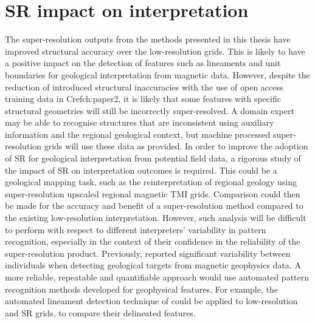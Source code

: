 \documentclass[manuscript.tex]{subfiles}
\begin{document}
\section{SR impact on interpretation}
The super-resolution outputs from the methods presented in this thesis have improved structural accuracy over the low-resolution grids.
This is likely to have a positive impact on the detection of features such as lineaments and unit boundaries for geological interpretation from magnetic data.
However, despite the reduction of introduced structural inaccuracies with the use of open access training data in Cref{ch:paper2}, it is likely that some features with specific structural geometries will still be incorrectly super-resolved.
A domain expert may be able to recognise structures that are inconsistent using auxiliary information and the regional geological context, but machine processed super-resolution grids will use these data as provided.
In order to improve the adoption of SR for geological interpretation from potential field data, a rigorous study of the impact of SR on interpretation outcomes is required.
This could be a geological mapping task, such as the reinterpretation of regional geology using super-resolution upscaled regional magnetic TMI grids.
Comparison could then be made for the accuracy and benefit of a super-resolution method compared to the existing low-resolution interpretation.
However, such analysis will be difficult to perform with respect to different interpreters' variability in pattern recognition, especially in the context of their confidence in the reliability of the super-resolution product.
Previously, \textcite{sivarajahIdentifyingEffectiveInterpretation2013} reported significant variability between individuals when detecting geological targets from magnetic geophysics data.
A more reliable, repeatable and quantifiable approach would use automated pattern recognition methods developed for geophysical features.
For example, the automated lineament detection technique of \textcite{holdenAutomaticIdentificationResponses2011,holdenAutomatedAnalysisRegional2008} could be applied to low-resolution and SR grids, to compare their delineated features.
\end{document}
